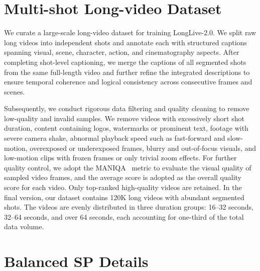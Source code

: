 \section{Multi-shot Long-video Dataset}
We curate a large-scale long-video dataset for training LongLive-2.0. We split raw long videos into independent shots and annotate each with structured captions spanning visual, scene, character, action, and cinematography aspects. After completing shot-level captioning, we merge the captions of all segmented shots from the same full-length video and further refine the integrated descriptions to ensure temporal coherence and logical consistency across consecutive frames and scenes.

Subsequently, we conduct rigorous data filtering and quality cleaning to remove low-quality and invalid samples. We remove videos with excessively short shot duration, content containing logos, watermarks or prominent text, footage with severe camera shake, abnormal playback speed such as fast-forward and slow-motion, overexposed or underexposed frames, blurry and out-of-focus visuals, and low-motion clips with frozen frames or only trivial zoom effects. For further quality control, we adopt the MANIQA~\cite{maniqa} metric to evaluate the visual quality of sampled video frames, and the average score is adopted as the overall quality score for each video. Only top-ranked high-quality videos are retained. In the final version, our dataset contains 120K long videos with abundant segmented shots. The videos are evenly distributed in three duration groups: 16–32 seconds, 32–64 seconds, and over 64 seconds, each accounting for one-third of the total data volume.


\section{Balanced SP Details}\label{ap:balanced_sp}


